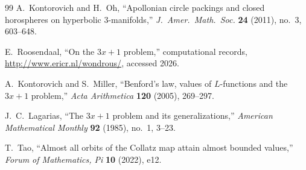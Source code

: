 \documentclass[11pt,a4paper]{article}
\theoremstyle{plain}
\theoremstyle{definition}
\theoremstyle{remark}
\numberwithin{equation}{section}
\begin{document}
\begin{thebibliography}{99}
A.~Kontorovich and H.~Oh, ``Apollonian circle packings and closed
horospheres on hyperbolic 3-manifolds,'' \emph{J.\ Amer.\ Math.\ Soc.}
\textbf{24} (2011), no.~3, 603--648.

E.~Roosendaal, ``On the $3x+1$ problem,'' computational records,
\url{http://www.ericr.nl/wondrous/}, accessed 2026.

A.~Kontorovich and S.~Miller, ``Benford's law, values of $L$-functions
and the $3x+1$ problem,'' \emph{Acta Arithmetica} \textbf{120} (2005),
269--297.

J.~C.~Lagarias, ``The $3x+1$ problem and its generalizations,''
\emph{American Mathematical Monthly} \textbf{92} (1985), no.~1, 3--23.

T.~Tao, ``Almost all orbits of the Collatz map attain almost bounded
values,'' \emph{Forum of Mathematics, Pi} \textbf{10} (2022), e12.

\end{thebibliography}
\end{document}
